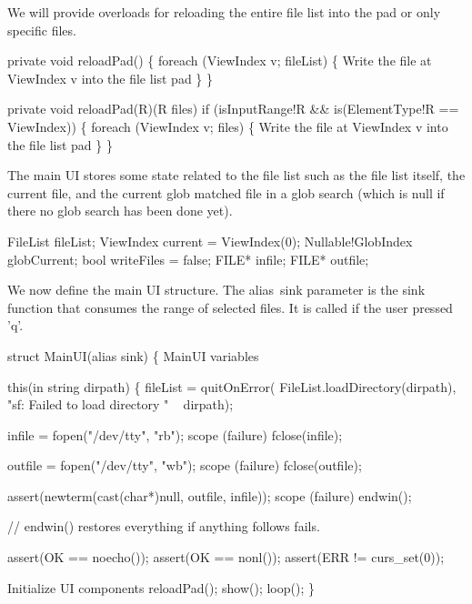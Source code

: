 \nwendcode{}We will provide overloads for reloading the entire file list into
the pad or only specific files.

\nwenddocs{}\endmoddef\nwstartdeflinemarkup\nwenddeflinemarkup
private void reloadPad()
\{
  foreach (ViewIndex v; fileList) \{
    \LA{}Write the file at ViewIndex v into the file list pad\RA{}
  \}
\}

private void reloadPad(R)(R files)
  if (isInputRange!R && is(ElementType!R == ViewIndex))
\{
  foreach (ViewIndex v; files) \{
    \LA{}Write the file at ViewIndex v into the file list pad\RA{}
  \}
\}

\nwendcode{}The main UI stores some state related to the file list such as the
file list itself, the current file, and the current glob matched file
in a glob search (which is null if there no glob search has been done
yet).

\nwenddocs{}\plusendmoddef\nwstartdeflinemarkup\nwenddeflinemarkup
FileList fileList;
ViewIndex current = ViewIndex(0);
Nullable!GlobIndex globCurrent;
bool writeFiles = false;
FILE* infile;
FILE* outfile;

\nwendcode{}We now define the main UI structure. The {\Tt{}alias\ sink\nwendquote} parameter is
the sink function that consumes the range of selected files. It is
called if the user pressed 'q'.

\nwenddocs{}\endmoddef\nwstartdeflinemarkup\nwenddeflinemarkup
struct MainUI(alias sink)
\{
  \LA{}MainUI variables\RA{}
  
  this(in string dirpath) \{
    fileList =
      quitOnError(
        FileList.loadDirectory(dirpath),
        "sf: Failed to load directory " ~ dirpath);
    
    infile  = fopen("/dev/tty", "rb");
    scope (failure) fclose(infile);
    
    outfile = fopen("/dev/tty", "wb");
    scope (failure) fclose(outfile);
    
    assert(newterm(cast(char*)null, outfile, infile));
    scope (failure) endwin();
    
    // endwin() restores everything if anything follows fails.
    
    assert(OK == noecho());
    assert(OK == nonl());
    assert(ERR != curs_set(0));
    
    \LA{}Initialize UI components\RA{}
    reloadPad();
    show();
    loop();
  \}

